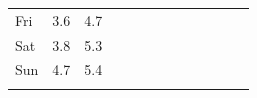 \documentclass{article}
\begin{document}
\begin{table}[h]
\begin{tabular}{lcccccccccccc}
{ Fri}                                                                                                                 & { 3.6}                                  & { 4.7}                                   & { }                         &                                                 & { }                         &                                                 & { }                            &                         & { }                         &                      & { }                         &                      \\
{ Sat}                                                                                                                 & { 3.8}                                  & { 5.3}                                   & { }                         &                                                 & { }                         &                                                 & { }                            &                         & { }                         &                      & { }                         &                      \\
{ Sun}                                                                                                                 & { 4.7}                                  & { 5.4}                                   & { }                         &                                                 & { }                         &                                                 & { }                            &                         & { }                         &                      & { }                         &                      \\
                                                                                                                                           &                                                             &                                                              & { }                         &                                                 & { }                         &                                                 & { }                            &                         & { }                         &                      & { }                         &                     
\end{tabular}
\end{table}

\newpage
\end{document}
